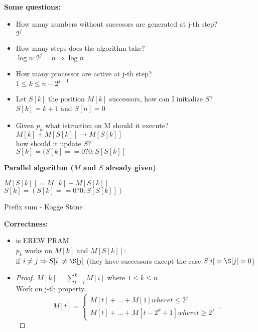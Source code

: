 \textbf{Some questions:}
\begin{itemize}
 \item How many numbers without succesors are generated at j-th step?\\
 $2^j$
 \item How many steps does the algorithm take?\\
 $\log{n} : 2^j = n \Rightarrow \log{n}$
 \item How many processor are active at j-th step?\\
 $1 \leq k \leq n - 2^{j-1}$
 \item Let $S[k]$ the position $M[k]$ successors, how can I initialize $S$?\\
 $S[k] = k + 1$ and $S[n] = 0$
 \item Given $p_k$ what istruction on M should it execute?\\
 $M[k] + M[S[k]] \rightarrow M[S[k]]$\\
 how should it update $S$?\\
 $S[k] = (S[k]==0 ? 0 : S[S[k]]$ 
\end{itemize} 

\textbf{Parallel algorithm ($M$ and $S$ already given)}\\
\begin{algorithm}[H]
 \SetAlgoLined
  {
   {   
   $M[S[k]] = M[k] + M[S[k]]$ \\
   $S[k] = (S[k]==0 ? 0 : S[S[k]])$ 
  }
 }
 \caption{Prefix sum - Kogge Stone}
\end{algorithm}

\textbf{Correctness:}
\begin{itemize}
 \item is EREW PRAM\\
 $p_k$ works on $M[k]$ and $M[S[k]]$:\\
 if $i \neq j \Rightarrow S[i] \neq \S[j]$ (they have successors except the case $S[i] = \S[j] = 0$)
 \item 
 \begin{proof}
 $M[k] = \sum_{i=i}^{k}M[i]$ where $1 \leq k \leq n$\\
 Work on j-th property.\\
  \begin{equation}
   M[t] = 
    \begin{cases}
      M[t] + \dots + M[1] where t \leq 2^j\\
      M[t] + \dots + M[t - 2^k + 1] where t \geq 2^j
    \end{cases}\,.
  \end{equation}
 
 \end{proof} 
\end{itemize}

